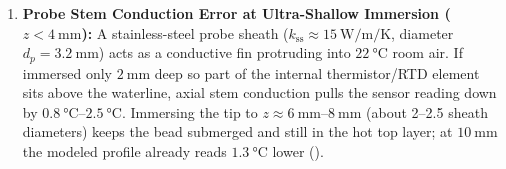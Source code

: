 \begin{enumerate}
  \item \textbf{Probe Stem Conduction Error at Ultra-Shallow Immersion ($z < \SI{4}{\milli\meter}$):} 
  A stainless-steel probe sheath ($k_{\mathrm{ss}} \approx \SI{15}{\watt\per\meter\per\kelvin}$, diameter $d_p = \SI{3.2}{\milli\meter}$) acts as a conductive fin protruding into $\SI{22}{\celsius}$ room air. If immersed only $\SI{2}{\milli\meter}$ deep so part of the internal thermistor/RTD element sits above the waterline, axial stem conduction pulls the sensor reading down by $\SIrange{0.8}{2.5}{\celsius}$. Immersing the tip to $z \approx \SIrange{6}{8}{\milli\meter}$ (about 2--2.5 sheath diameters) keeps the bead submerged and still in the hot top layer; at $\SI{10}{\milli\meter}$ the modeled profile already reads $\SI{1.3}{\celsius}$ lower ().
\end{enumerate}

